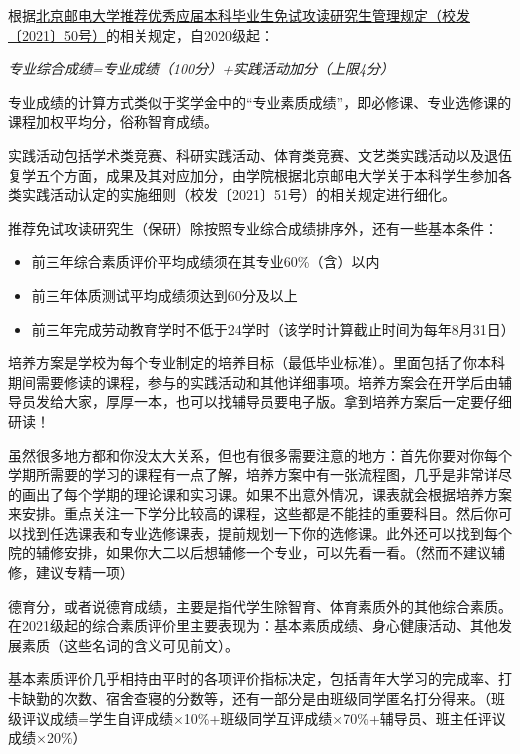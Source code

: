 根据\href{http://my.bupt.edu.cn/content.jsp?urltype=news.NewsContentUrl&wbtreeid=1036&wbnewsid=95475}{北京邮电大学推荐优秀应届本科毕业生免试攻读研究生管理规定（校发〔2021〕50号）}的相关规定，自2020级起：
\begin{center}
    \emph{专业综合成绩=专业成绩（100分）+实践活动加分（上限4分）}
\end{center}

专业成绩的计算方式类似于奖学金中的“专业素质成绩”，即必修课、专业选修课的课程加权平均分，俗称智育成绩。

实践活动包括学术类竞赛、科研实践活动、体育类竞赛、文艺类实践活动以及退伍复学五个方面，成果及其对应加分，由学院根据北京邮电大学关于本科学生参加各类实践活动认定的实施细则（校发〔2021〕51号）的相关规定进行细化。

推荐免试攻读研究生（保研）除按照专业综合成绩排序外，还有一些基本条件：
\begin{itemize}
    \kaishu
    \item 前三年综合素质评价平均成绩须在其专业60\%（含）以内
    \item 前三年体质测试平均成绩须达到60分及以上
    \item 前三年完成劳动教育学时不低于24学时（该学时计算截止时间为每年8月31日）
\end{itemize}


培养方案是学校为每个专业制定的培养目标（最低毕业标准）。里面包括了你本科期间需要修读的课程，参与的实践活动和其他详细事项。培养方案会在开学后由辅导员发给大家，厚厚一本，也可以找辅导员要电子版。拿到培养方案后一定要仔细研读！

虽然很多地方都和你没太大关系，但也有很多需要注意的地方：首先你要对你每个学期所需要的学习的课程有一点了解，培养方案中有一张流程图，几乎是非常详尽的画出了每个学期的理论课和实习课。如果不出意外情况，课表就会根据培养方案来安排。重点关注一下学分比较高的课程，这些都是不能挂的重要科目。然后你可以找到任选课表和专业选修课表，提前规划一下你的选修课。此外还可以找到每个院的辅修安排，如果你大二以后想辅修一个专业，可以先看一看。（然而不建议辅修，建议专精一项）


德育分，或者说德育成绩，主要是指代学生除智育、体育素质外的其他综合素质。在2021级起的综合素质评价里主要表现为：基本素质成绩、身心健康活动、其他发展素质（这些名词的含义可见前文）。

基本素质评价几乎相持由平时的各项评价指标决定，包括青年大学习的完成率、打卡缺勤的次数、宿舍查寝的分数等，还有一部分是由班级同学匿名打分得来。（班级评议成绩=学生自评成绩×10\%+班级同学互评成绩×70\%+辅导员、班主任评议成绩×20\%）

